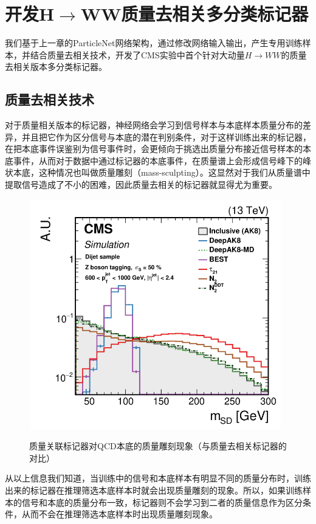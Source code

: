 \chapter{开发H$\to$WW质量去相关多分类标记器}
\label{chap5}
\fontsize{12bp}{14.4pt}
我们基于上一章的ParticleNet网络架构，通过修改网络输入输出，产生专用训练样本，并结合质量去相关技术，开发了CMS实验中首个针对大动量$H\to WW$的质量去相关版本多分类标记器。

\section{质量去相关技术}
对于质量相关版本的标记器，神经网络会学习到信号样本与本底样本质量分布的差异，并且把它作为区分信号与本底的潜在判别条件，对于这样训练出来的标记器，在把本底事件误鉴别为信号事件时，会更倾向于挑选出质量分布接近信号样本的本底事件，从而对于数据中通过标记器的本底事件，在质量谱上会形成信号峰下的峰状本底，这种情况也叫做质量雕刻（mass-sculpting）。这显然对于我们从质量谱中提取信号造成了不小的困难，因此质量去相关的标记器就显得尤为重要。

\begin{figure}[H]
 \centering
 \caption{质量关联标记器对QCD本底的质量雕刻现象（与质量去相关标记器的对比）\cite{jet-tagging-algorithms}}
 \includegraphics[height=10cm, width=11cm]{pictures/nonMDtagger.png}
 \label{fig:5.1}
\end{figure}

从以上信息我们知道，当训练中的信号和本底样本有明显不同的质量分布时，训练出来的标记器在推理筛选本底样本时就会出现质量雕刻的现象。所以，如果训练样本的信号和本底的质量分布一致，标记器则不会学习到二者的质量信息作为区分条件，从而不会在推理筛选本底样本时出现质量雕刻现象\cite{deepak8andmass-decorrelation}。

